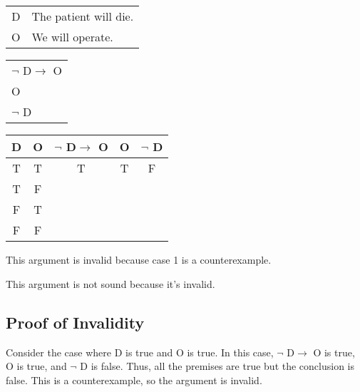 \section{}
\centering
\begin{tabular}{r l}
    D & The patient will die. \\
    O & We will operate.
\end{tabular}
\begin{tabular}{l}
    $\lnot$ D$\rightarrow$ O\\
    O\\
    \hline
    $\lnot$ D
\end{tabular}

\begin{tabular}{c|c||c|c||c}
    D & O & $\lnot$ D$\rightarrow$ O & O & $\lnot$ D \\
    \hline
    T & T & T & T & F \\
    T & F &   &   &   \\
    F & T &   &   &   \\
    F & F &   &   &  
\end{tabular}

\justifying
\noindent This argument is invalid because case 1 is a counterexample.

\noindent This argument is not sound because it's invalid.

\subsection*{Proof of Invalidity}
Consider the case where D  is true and O  is true. In this case, $\lnot$ D$\rightarrow$ O  is true, O  is true, and $\lnot$ D  is false. Thus, all the premises are true but the conclusion is false. This is a counterexample, so the argument is invalid.